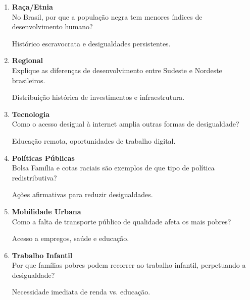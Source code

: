 \documentclass[11pt]{article}
\begin{document}
\begin{multicols}{2}
\begin{enumerate}
\item \textbf{Raça/Etnia}\\
No Brasil, por que a população negra tem menores índices de desenvolvimento humano?
\begin{tcolorbox}[colback=explanationbg,colframe=titleblue,title=Dica:]
Histórico escravocrata e desigualdades persistentes.
\end{tcolorbox}

\item \textbf{Regional}\\
Explique as diferenças de desenvolvimento entre Sudeste e Nordeste brasileiros.
\begin{tcolorbox}[colback=explanationbg,colframe=titleblue,title=Dica:]
Distribuição histórica de investimentos e infraestrutura.
\end{tcolorbox}

\item \textbf{Tecnologia}\\
Como o acesso desigual à internet amplia outras formas de desigualdade?
\begin{tcolorbox}[colback=explanationbg,colframe=titleblue,title=Dica:]
Educação remota, oportunidades de trabalho digital.
\end{tcolorbox}

\item \textbf{Políticas Públicas}\\
Bolsa Família e cotas raciais são exemplos de que tipo de política redistributiva?
\begin{tcolorbox}[colback=explanationbg,colframe=titleblue,title=Dica:]
Ações afirmativas para reduzir desigualdades.
\end{tcolorbox}

\item \textbf{Mobilidade Urbana}\\
Como a falta de transporte público de qualidade afeta os mais pobres?
\begin{tcolorbox}[colback=explanationbg,colframe=titleblue,title=Dica:]
Acesso a empregos, saúde e educação.
\end{tcolorbox}

\item \textbf{Trabalho Infantil}\\
Por que famílias pobres podem recorrer ao trabalho infantil, perpetuando a desigualdade?
\begin{tcolorbox}[colback=explanationbg,colframe=titleblue,title=Dica:]
Necessidade imediata de renda vs. educação.
\end{tcolorbox}

\end{enumerate}
\end{multicols}
\end{document}
